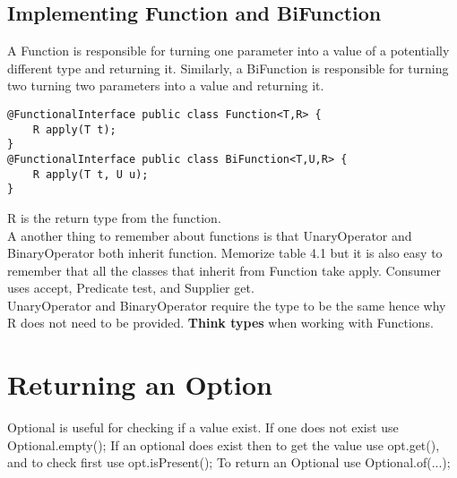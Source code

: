 \documentclass[12pt]{article}
\begin{document}
\subsection{Implementing Function and BiFunction}
A Function is responsible for turning one parameter into a value of a potentially different type and returning it.
Similarly, a BiFunction is responsible for turning two turning two parameters into a value and returning it.
\begin{mdframed}[backgroundcolor=light-gray, roundcorner=10pt,leftmargin=1, rightmargin=1, innerleftmargin=15, innertopmargin=15,innerbottommargin=15, outerlinewidth=1, linecolor=light-gray]
\begin{lstlisting}
@FunctionalInterface public class Function<T,R> {
	R apply(T t);
}
@FunctionalInterface public class BiFunction<T,U,R> {
	R apply(T t, U u);
}
\end{lstlisting}
\end{mdframed} 
R is the return type from the function. \\

A another thing to remember about functions is that UnaryOperator and BinaryOperator both inherit function.
Memorize table 4.1 but it is also easy to remember that all the classes that inherit from Function take apply. 
Consumer uses accept, Predicate test, and Supplier get. \\
UnaryOperator and BinaryOperator require the type to be the same hence why R does not need to be provided. \textbf{Think types} when working with Functions.

\section{ Returning an Option }
Optional is useful for checking if a value exist. If one does not exist use Optional.empty();
If an optional does exist then to get the value use opt.get(), and to check first use opt.isPresent();
To return an Optional use Optional.of(...);

\end{document}
